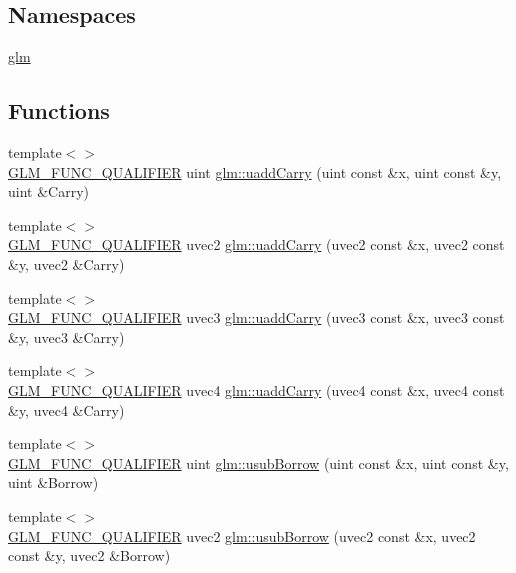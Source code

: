\subsection*{Namespaces}
\begin{DoxyCompactItemize}
\item 
 \hyperlink{namespaceglm}{glm}
\end{DoxyCompactItemize}
\subsection*{Functions}
\begin{DoxyCompactItemize}
\item 
{\footnotesize template$<$$>$ }\\\hyperlink{setup_8hpp_a33fdea6f91c5f834105f7415e2a64407}{G\+L\+M\+\_\+\+F\+U\+N\+C\+\_\+\+Q\+U\+A\+L\+I\+F\+I\+ER} uint \hyperlink{namespaceglm_a58f7d2bd0bc8d3af9e362e904fd20aa3}{glm\+::uadd\+Carry} (uint const \&x, uint const \&y, uint \&Carry)
\item 
{\footnotesize template$<$$>$ }\\\hyperlink{setup_8hpp_a33fdea6f91c5f834105f7415e2a64407}{G\+L\+M\+\_\+\+F\+U\+N\+C\+\_\+\+Q\+U\+A\+L\+I\+F\+I\+ER} uvec2 \hyperlink{namespaceglm_a9dab4b979638deec548f2d2a3e1700a8}{glm\+::uadd\+Carry} (uvec2 const \&x, uvec2 const \&y, uvec2 \&Carry)
\item 
{\footnotesize template$<$$>$ }\\\hyperlink{setup_8hpp_a33fdea6f91c5f834105f7415e2a64407}{G\+L\+M\+\_\+\+F\+U\+N\+C\+\_\+\+Q\+U\+A\+L\+I\+F\+I\+ER} uvec3 \hyperlink{namespaceglm_a2e6210424a7addf84cdeaf17f583d2da}{glm\+::uadd\+Carry} (uvec3 const \&x, uvec3 const \&y, uvec3 \&Carry)
\item 
{\footnotesize template$<$$>$ }\\\hyperlink{setup_8hpp_a33fdea6f91c5f834105f7415e2a64407}{G\+L\+M\+\_\+\+F\+U\+N\+C\+\_\+\+Q\+U\+A\+L\+I\+F\+I\+ER} uvec4 \hyperlink{namespaceglm_af3ad9f57d6e505779a8b35546c31d08b}{glm\+::uadd\+Carry} (uvec4 const \&x, uvec4 const \&y, uvec4 \&Carry)
\item 
{\footnotesize template$<$$>$ }\\\hyperlink{setup_8hpp_a33fdea6f91c5f834105f7415e2a64407}{G\+L\+M\+\_\+\+F\+U\+N\+C\+\_\+\+Q\+U\+A\+L\+I\+F\+I\+ER} uint \hyperlink{namespaceglm_a8b489a758eb61d6308ecdf33081da3be}{glm\+::usub\+Borrow} (uint const \&x, uint const \&y, uint \&Borrow)
\item 
{\footnotesize template$<$$>$ }\\\hyperlink{setup_8hpp_a33fdea6f91c5f834105f7415e2a64407}{G\+L\+M\+\_\+\+F\+U\+N\+C\+\_\+\+Q\+U\+A\+L\+I\+F\+I\+ER} uvec2 \hyperlink{namespaceglm_a5c3c7dfa6a8edab85fce4a945e0dc373}{glm\+::usub\+Borrow} (uvec2 const \&x, uvec2 const \&y, uvec2 \&Borrow)

\end{DoxyCompactItemize}

